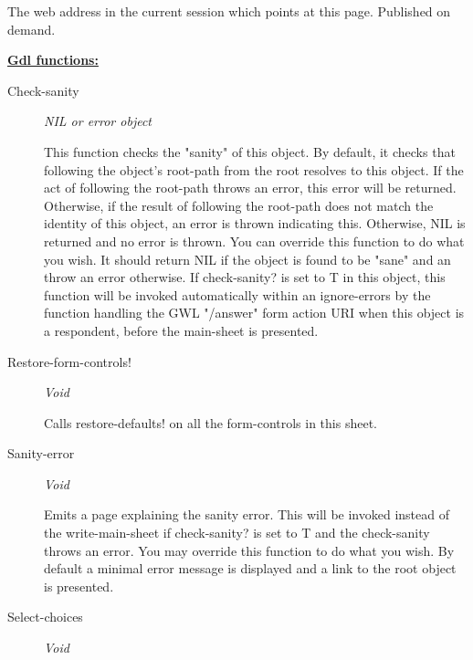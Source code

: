 \documentclass [11pt]{book}
\begin{document}
\begin{itemize}
\begin{description}
 The web address in the current session which points at this page. Published on demand.




\end{description}






\textbf{
\underline{Gdl functions:}}

\begin{description}

\item [Check-sanity]
\emph{NIL or error object}

 This function checks the "sanity" of this object. By
default, it checks that following the object's root-path from the root resolves
to this object. If the act of following the root-path throws an error, this error
will be returned. Otherwise, if the result of following the root-path does not
match the identity of this object, an error is thrown indicating this. Otherwise,
NIL is returned and no error is thrown. You can override this function to do what
you wish. It should return NIL if the object is found to be "sane" and an throw
an error otherwise.
If check-sanity? is set to T in this object, this function will be invoked automatically
within an ignore-errors by the function handling the GWL "/answer" form action URI
when this object is a respondent, before the main-sheet is presented.




\item [Restore-form-controls!]
\emph{Void}

 Calls restore-defaults! on all the form-controls in this sheet.




\item [Sanity-error]
\emph{Void}

 Emits a page explaining the sanity error. This will be invoked instead of the write-main-sheet
if check-sanity? is set to T and the check-sanity throws an error. You may override this function to
do what you wish. By default a minimal error message is displayed and a link to the root object
is presented.




\item [Select-choices]
\emph{Void}


\end{description}
\end{itemize}
\end{document}
